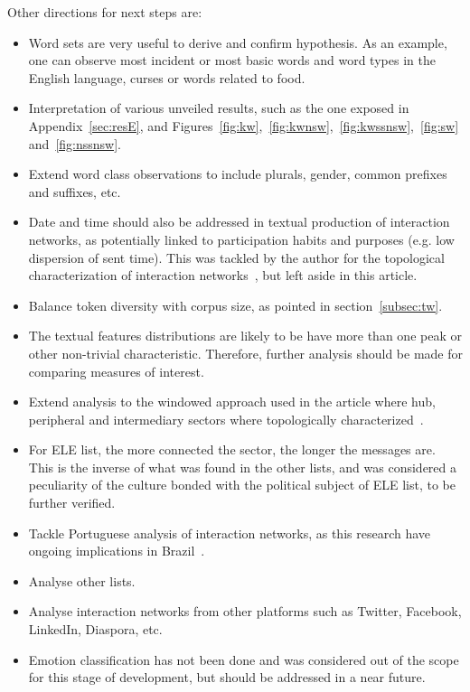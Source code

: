 \documentclass[%
 aip,
 jmp,%
 amsmath,amssymb,
 reprint,%
]{revtex4-1}
\begin{document}
Other directions for next steps are:
\begin{itemize}
    \item Word sets are very useful to derive and confirm hypothesis. As an example, one can observe most incident or most basic words and word types in the English language, curses or words related to food.
    \item Interpretation of various unveiled results, such as the one exposed in Appendix~\ref{sec:resE}, and Figures~\ref{fig:kw},~\ref{fig:kwnsw},~\ref{fig:kwssnsw},~\ref{fig:sw} and~\ref{fig:nssnsw}.
    \item Extend word class observations to include plurals, gender, common prefixes and suffixes, etc.
    \item Date and time should also be addressed in textual production of interaction networks, as potentially linked to participation habits and purposes (e.g. low dispersion of sent time). This was tackled by the author for the topological characterization of interaction networks~\cite{evoSN}, but left aside in this article.
    \item Balance token diversity with corpus size, as pointed in section~\ref{subsec:tw}.
    \item The textual features distributions are likely to be have more than one peak or other non-trivial characteristic. Therefore, further analysis should be made for comparing measures of interest.
    \item Extend analysis to the windowed approach used in the article where hub, peripheral and intermediary sectors where topologically characterized~\cite{evoSN}.
    \item For ELE list, the more connected the sector, the longer the messages are. This is the inverse of what was found in the other lists, and was considered a peculiarity of the culture bonded with the political subject of ELE list, to be further verified.
    \item Tackle Portuguese analysis of interaction networks, as this research have ongoing implications in Brazil~\cite{ensaio}.
    \item Analyse other lists.
    \item Analyse interaction networks from other platforms such as Twitter, Facebook, LinkedIn, Diaspora, etc.
    \item Emotion classification has not been done and was considered out of the scope for this stage of development, but should be addressed in a near future.
\end{itemize}
\end{document}
